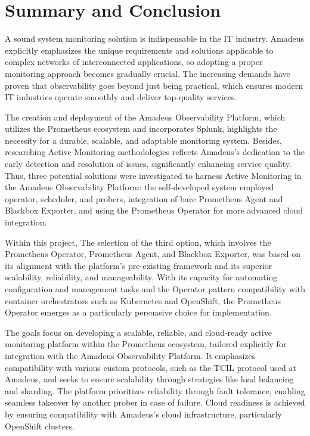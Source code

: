 
\chapter{Summary and Conclusion}\label{chapter:summary_and_conclusion}

A sound system monitoring solution is indispensable in the IT industry. Amadeus explicitly emphasizes the unique requirements and solutions applicable to complex networks of interconnected applications, so adopting a proper monitoring approach becomes gradually crucial. The increasing demands have proven that observability goes beyond just being practical, which ensures modern IT industries operate smoothly and deliver top-quality services. 

The creation and deployment of the Amadeus Observability Platform, which utilizes the Prometheus ecosystem and incorporates Splunk, highlights the necessity for a durable, scalable, and adaptable monitoring system. Besides, researching Active Monitoring methodologies reflects Amadeus's dedication to the early detection and resolution of issues, significantly enhancing service quality. Thus, three potential solutions were investigated to harness Active Monitoring in the Amadeus Observability Platform: the self-developed system employed operator, scheduler, and probers, integration of bare Prometheus Agent and Blackbox Exporter, and using the Prometheus Operator for more advanced cloud integration. 

Within this project, The selection of the third option, which involves the Prometheus Operator, Prometheus Agent, and Blackbox Exporter, was based on its alignment with the platform's pre-existing framework and its superior scalability, reliability, and manageability. With its capacity for automating configuration and management tasks and the Operator pattern compatibility with container orchestrators such as Kubernetes and OpenShift, the Prometheus Operator emerges as a particularly persuasive choice for implementation. 

The goals focus on developing a scalable, reliable, and cloud-ready active monitoring platform within the Prometheus ecosystem, tailored explicitly for integration with the Amadeus Observability Platform. It emphasizes compatibility with various custom protocols, such as the \ac{TCIL} protocol used at Amadeus, and seeks to ensure scalability through strategies like load balancing and sharding. The platform prioritizes reliability through fault tolerance, enabling seamless takeover by another prober in case of failure. Cloud readiness is achieved by ensuring compatibility with Amadeus's cloud infrastructure, particularly OpenShift clusters. 

